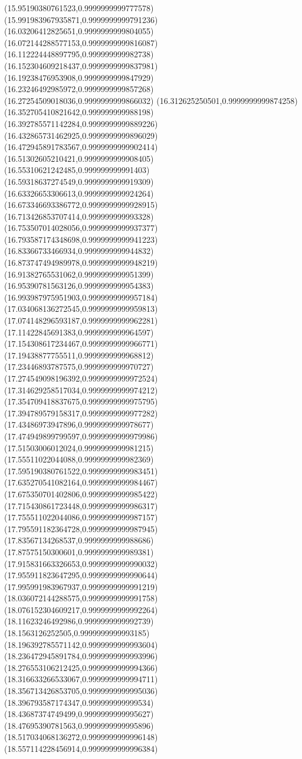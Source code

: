 {(15.95190380761523,0.9999999999777578)
(15.991983967935871,0.9999999999791236)
(16.03206412825651,0.9999999999804055)
(16.072144288577153,0.9999999999816087)
(16.112224448897795,0.999999999982738)
(16.152304609218437,0.9999999999837981)
(16.19238476953908,0.9999999999847929)
(16.23246492985972,0.9999999999857268)
(16.27254509018036,0.9999999999866032)
(16.312625250501,0.9999999999874258)
(16.352705410821642,0.999999999988198)
(16.392785571142284,0.9999999999889226)
(16.432865731462925,0.9999999999896029)
(16.472945891783567,0.9999999999902414)
(16.51302605210421,0.9999999999908405)
(16.55310621242485,0.999999999991403)
(16.59318637274549,0.9999999999919309)
(16.63326653306613,0.9999999999924264)
(16.673346693386772,0.9999999999928915)
(16.713426853707414,0.999999999993328)
(16.753507014028056,0.9999999999937377)
(16.793587174348698,0.9999999999941223)
(16.83366733466934,0.9999999999944832)
(16.873747494989978,0.9999999999948219)
(16.91382765531062,0.9999999999951399)
(16.95390781563126,0.9999999999954383)
(16.993987975951903,0.9999999999957184)
(17.034068136272545,0.9999999999959813)
(17.074148296593187,0.9999999999962281)
(17.11422845691383,0.9999999999964597)
(17.154308617234467,0.9999999999966771)
(17.19438877755511,0.9999999999968812)
(17.23446893787575,0.9999999999970727)
(17.274549098196392,0.9999999999972524)
(17.314629258517034,0.9999999999974212)
(17.354709418837675,0.9999999999975795)
(17.394789579158317,0.9999999999977282)
(17.43486973947896,0.9999999999978677)
(17.474949899799597,0.9999999999979986)
(17.51503006012024,0.9999999999981215)
(17.55511022044088,0.9999999999982369)
(17.595190380761522,0.9999999999983451)
(17.635270541082164,0.9999999999984467)
(17.675350701402806,0.9999999999985422)
(17.715430861723448,0.9999999999986317)
(17.755511022044086,0.9999999999987157)
(17.795591182364728,0.9999999999987945)
(17.83567134268537,0.9999999999988686)
(17.87575150300601,0.9999999999989381)
(17.915831663326653,0.9999999999990032)
(17.955911823647295,0.9999999999990644)
(17.995991983967937,0.9999999999991219)
(18.036072144288575,0.9999999999991758)
(18.076152304609217,0.9999999999992264)
(18.11623246492986,0.9999999999992739)
(18.1563126252505,0.9999999999993185)
(18.196392785571142,0.9999999999993604)
(18.236472945891784,0.9999999999993996)
(18.276553106212425,0.9999999999994366)
(18.316633266533067,0.9999999999994711)
(18.356713426853705,0.9999999999995036)
(18.396793587174347,0.999999999999534)
(18.43687374749499,0.9999999999995627)
(18.47695390781563,0.9999999999995896)
(18.517034068136272,0.9999999999996148)
(18.557114228456914,0.9999999999996384)
}
